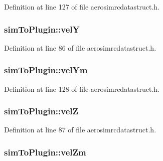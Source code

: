 Definition at line 127 of file aerosimrcdatastruct.\-h.

\hypertarget{group___aero_sim_r_c_gae4f260f3786184d15cd8f674860f8866}{
\subsubsection[{vel\-Y}]{ sim\-To\-Plugin\-::vel\-Y}}\label{group___aero_sim_r_c_gae4f260f3786184d15cd8f674860f8866}


Definition at line 86 of file aerosimrcdatastruct.\-h.

\hypertarget{group___aero_sim_r_c_ga78ba6a4d5b2134bed1c2396ff9212df0}{
\subsubsection[{vel\-Ym}]{ sim\-To\-Plugin\-::vel\-Ym}}\label{group___aero_sim_r_c_ga78ba6a4d5b2134bed1c2396ff9212df0}


Definition at line 128 of file aerosimrcdatastruct.\-h.

\hypertarget{group___aero_sim_r_c_ga2703ca3343da97af3ee57b5e6f36cbb9}{
\subsubsection[{vel\-Z}]{ sim\-To\-Plugin\-::vel\-Z}}\label{group___aero_sim_r_c_ga2703ca3343da97af3ee57b5e6f36cbb9}


Definition at line 87 of file aerosimrcdatastruct.\-h.

\hypertarget{group___aero_sim_r_c_ga35865106b3179109ebbec06aed189fad}{
\subsubsection[{vel\-Zm}]{ sim\-To\-Plugin\-::vel\-Zm}}\label{group___aero_sim_r_c_ga35865106b3179109ebbec06aed189fad}



